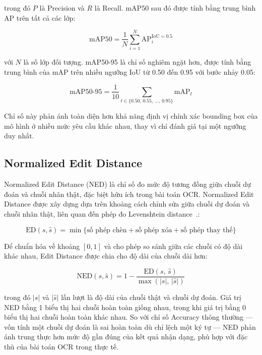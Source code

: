 \documentclass[13pt,a4paper]{report}
\begin{document}
trong đó $P$ là Precision và $R$ là Recall. mAP50 sau đó được tính bằng trung bình AP trên tất cả các lớp:

\begin{equation}
	\text{mAP50} = \frac{1}{N} \sum_{i=1}^{N} \text{AP}_{i}^{\text{IoU}=0.5}
\end{equation}

với $N$ là số lớp đối tượng. mAP50-95 là chỉ số nghiêm ngặt hơn, được tính bằng trung bình của mAP trên nhiều ngưỡng IoU từ 0.50 đến 0.95 với bước nhảy 0.05:

\begin{equation}
	\text{mAP50-95} = \frac{1}{10} \sum_{t \in \{0.50,\, 0.55,\, \ldots,\, 0.95\}} \text{mAP}_{t}
\end{equation}

Chỉ số này phản ánh toàn diện hơn khả năng định vị chính xác bounding box của mô hình ở nhiều mức yêu cầu khác nhau, thay vì chỉ đánh giá tại một ngưỡng duy nhất.

\subsection{Normalized Edit Distance}

Normalized Edit Distance (NED) là chỉ số đo mức độ tương đồng giữa chuỗi dự đoán và chuỗi nhãn thật, đặc biệt hữu ích trong bài toán OCR. Normalized Edit Distance được xây dựng dựa trên khoảng cách chỉnh sửa giữa chuỗi dự đoán và chuỗi nhãn thật, liên quan đến phép đo Levenshtein distance~\cite{levenshtein1966}.:

\begin{equation}
	\text{ED}(s, \hat{s}) = \min \{\text{số phép chèn} + \text{số phép xóa} + \text{số phép thay thế}\}
\end{equation}

Để chuẩn hóa về khoảng $[0, 1]$ và cho phép so sánh giữa các chuỗi có độ dài khác nhau, Edit Distance được chia cho độ dài của chuỗi dài hơn:

\begin{equation}
	\text{NED}(s, \hat{s}) = 1 - \frac{\text{ED}(s,\, \hat{s})}{\max(|s|,\, |\hat{s}|)}
\end{equation}

trong đó $|s|$ và $|\hat{s}|$ lần lượt là độ dài của chuỗi thật và chuỗi dự đoán. Giá trị NED bằng 1 biểu thị hai chuỗi hoàn toàn giống nhau, trong khi giá trị bằng 0 biểu thị hai chuỗi hoàn toàn khác nhau. So với chỉ số Accuracy thông thường — vốn tính một chuỗi dự đoán là sai hoàn toàn dù chỉ lệch một ký tự — NED phản ánh trung thực hơn mức độ gần đúng của kết quả nhận dạng, phù hợp với đặc thù của bài toán OCR trong thực tế.
\end{document}
